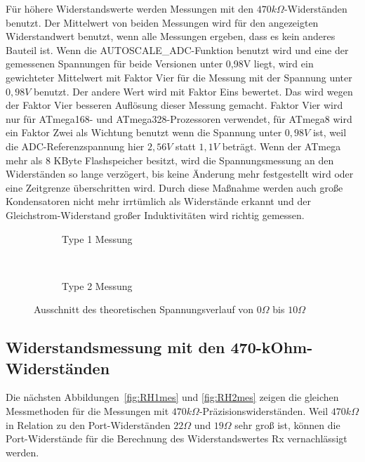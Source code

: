 Für höhere Widerstandswerte werden Messungen mit den \(470k\Omega\)-Widerständen benutzt.
Der Mittelwert von beiden Messungen wird für den angezeigten Widerstandwert benutzt, wenn alle Messungen ergeben,
dass es kein anderes Bauteil ist.
Wenn die AUTOSCALE\_ADC-Funktion benutzt wird und eine der gemessenen Spannungen für beide Versionen unter 0,98V liegt,
wird ein gewichteter Mittelwert mit Faktor Vier für die Messung mit der Spannung unter \(0,98V\) benutzt. Der andere Wert wird mit Faktor Eins bewertet.
Das wird wegen der Faktor Vier besseren Auflösung dieser Messung gemacht.
Faktor Vier wird nur für ATmega168- und ATmega328-Prozessoren verwendet, für ATmega8 wird ein
Faktor Zwei als Wichtung benutzt wenn die Spannung unter \(0,98V\) ist, weil die ADC-Referenzspannung hier \(2,56V\) statt \(1,1V\) beträgt.
Wenn der ATmega mehr als 8 KByte Flashspeicher besitzt, wird die Spannungsmessung an den Widerständen so lange verzögert,
bis keine Änderung mehr festgestellt wird oder eine Zeitgrenze überschritten wird.
Durch diese Maßnahme werden auch große Kondensatoren nicht mehr irrtümlich als
Widerstände erkannt und der Gleichstrom-Widerstand großer Induktivitäten wird richtig gemessen.

\begin{figure}[H]
  \begin{subfigure}[b]{9cm}
    \centering
    \resizebox{9cm}{!}{}
    \caption{Type 1 Messung}
    \label{fig:RLvlow}
  \end{subfigure}
  ~
  \begin{subfigure}[b]{9cm}
    \centering
    \resizebox{9cm}{!}{}
    \caption{Type 2 Messung}
    \label{fig:RLvhigh}
  \end{subfigure}
  \caption{Ausschnitt des theoretischen Spannungsverlauf von \(0\Omega\) bis \(10\Omega\)}
\end{figure}


\subsection{Widerstandsmessung mit den 470-kOhm-Widerständen}
Die nächsten Abbildungen~\ref{fig:RH1mes} und \ref{fig:RH2mes} zeigen die gleichen Messmethoden für die Messungen mit
 \(470k\Omega\)-Präzisionswiderständen.
Weil \(470k\Omega\) in Relation zu den Port-Widerständen \(22\Omega\) und \(19\Omega\) sehr groß ist,
können die Port-Widerstände für die Berechnung des Widerstandswertes Rx vernachlässigt werden.

